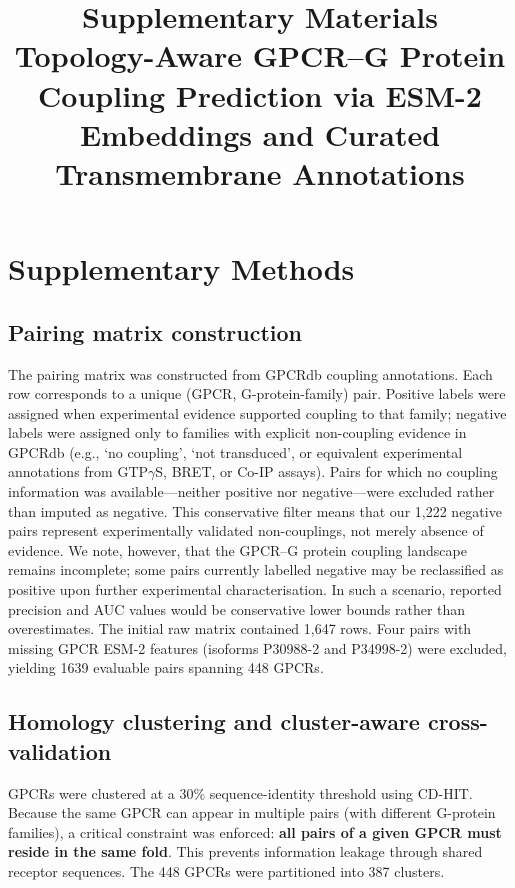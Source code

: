 \documentclass[11pt,a4paper]{article}
\title{\textbf{Supplementary Materials} \\ \vspace{0.5cm} \large Topology-Aware GPCR--G Protein Coupling Prediction via ESM-2 Embeddings and Curated Transmembrane Annotations}
\author{}
\date{}
\begin{document}
\maketitle

\tableofcontents
\newpage

\section{Supplementary Methods}

\subsection{Pairing matrix construction}

The pairing matrix was constructed from GPCRdb coupling annotations. Each row corresponds to a unique (GPCR, G-protein-family) pair. Positive labels were assigned when experimental evidence supported coupling to that family; negative labels were assigned only to families with explicit non-coupling evidence in GPCRdb (e.g., `no coupling', `not transduced', or equivalent experimental annotations from GTP$\gamma$S, BRET, or Co-IP assays). Pairs for which no coupling information was available---neither positive nor negative---were excluded rather than imputed as negative. This conservative filter means that our 1,222 negative pairs represent experimentally validated non-couplings, not merely absence of evidence. We note, however, that the GPCR--G protein coupling landscape remains incomplete; some pairs currently labelled negative may be reclassified as positive upon further experimental characterisation. In such a scenario, reported precision and AUC values would be conservative lower bounds rather than overestimates. The initial raw matrix contained 1,647 rows. Four pairs with missing GPCR ESM-2 features (isoforms P30988-2 and P34998-2) were excluded, yielding \num{1639} evaluable pairs spanning 448 GPCRs.

\subsection{Homology clustering and cluster-aware cross-validation}

GPCRs were clustered at a 30\% sequence-identity threshold using CD-HIT. Because the same GPCR can appear in multiple pairs (with different G-protein families), a critical constraint was enforced: \textbf{all pairs of a given GPCR must reside in the same fold}. This prevents information leakage through shared receptor sequences. The 448 GPCRs were partitioned into 387 clusters.
\end{document}
